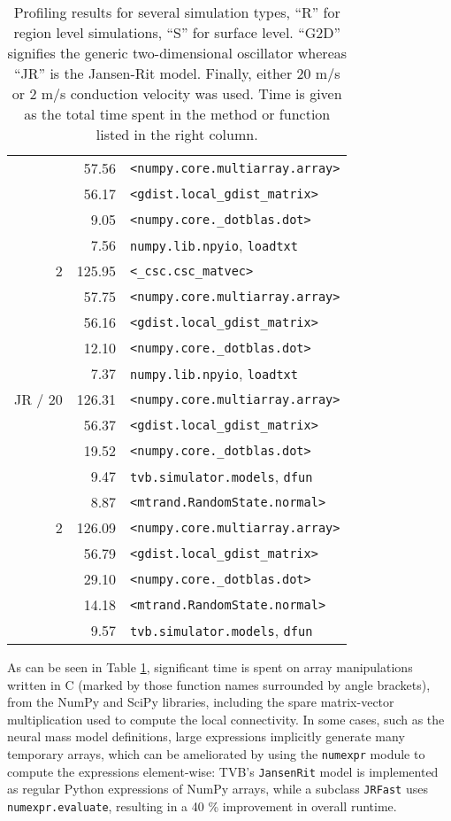 \documentclass{bioinfo}
\begin{document}
\begin{table}
{\begin{tabular}{r | r | l }
	&         57.56& \texttt{<numpy.core.multiarray.array>} \\
	 &         56.17& \texttt{<gdist.local\_gdist\_matrix>} \\
	 &           9.05& \texttt{<numpy.core.\_dotblas.dot>} \\
	 &         7.56& \texttt{numpy.lib.npyio}, \texttt{loadtxt} \\
	\hline
	2 &         125.95& \texttt{<\_csc.csc\_matvec>} \\
	&         57.75& \texttt{<numpy.core.multiarray.array>} \\
	 &         56.16& \texttt{<gdist.local\_gdist\_matrix>} \\
	 &         12.10& \texttt{<numpy.core.\_dotblas.dot>} \\
	 &         7.37& \texttt{numpy.lib.npyio}, \texttt{loadtxt} \\
	\hline
	JR / 20 &         126.31& \texttt{<numpy.core.multiarray.array>} \\
	&         56.37& \texttt{<gdist.local\_gdist\_matrix>} \\
	 &         19.52& \texttt{<numpy.core.\_dotblas.dot>} \\
	 &         9.47& \texttt{tvb.simulator.models}, \texttt{dfun} \\
	 &         8.87& \texttt{<mtrand.RandomState.normal>} \\
	\hline
	2 &         126.09& \texttt{<numpy.core.multiarray.array>} \\
	&         56.79& \texttt{<gdist.local\_gdist\_matrix>} \\
	 &          29.10& \texttt{<numpy.core.\_dotblas.dot>} \\
	 &         14.18& \texttt{<mtrand.RandomState.normal>} \\
	 &         9.57& \texttt{tvb.simulator.models}, \texttt{dfun} \\
	\hline

	\end{tabular}}
	\caption{Profiling results for several simulation types, ``R'' for region 
	level simulations, ``S'' for surface level. ``G2D'' signifies the generic
	two-dimensional oscillator whereas ``JR'' is the Jansen-Rit model. Finally,
	either 20 m/s or 2 m/s conduction velocity was used. Time is given as the
	total time spent in the method or function listed in the right column.}
	\label{tab:profiling}
	\end{table}


As can be seen in Table \ref{tab:profiling},
significant time is spent on array manipulations written in C (marked by those
function names surrounded by angle brackets), from the NumPy and SciPy libraries, 
including the spare matrix-vector multiplication used to compute the local connectivity.
In some cases, such as the 
neural mass model definitions, large expressions implicitly generate many 
temporary arrays, which can be ameliorated by using the \texttt{numexpr} module
to compute the expressions element-wise: TVB's \texttt{JansenRit} model is
implemented as regular Python expressions of NumPy arrays, while a subclass
\texttt{JRFast} uses \texttt{numexpr.evaluate}, resulting in a 40 \% improvement
in overall runtime.
\end{document}
